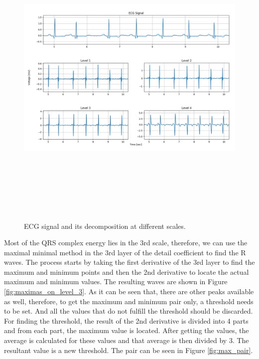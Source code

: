 \begin{figure}[htpb]
	\centering
	\includegraphics[width=15cm,height=15cm,keepaspectratio=true]{images/detail_coefficients}
	\caption{
		ECG signal and its decomposition at different scales.
	}
	\label{fig:detail_coefficients}
\end{figure}

Most of the QRS complex energy lies in the 3rd scale, therefore, we can use the maximal minimal method in the 3rd layer of the detail coefficient to find the R waves.  The process starts by taking the first derivative of the 3rd layer to find the maximum and minimum points and then the 2nd derivative to locate the actual maximum and minimum values. The resulting waves are shown in Figure \ref{fig:maximas_on_level_3}. As it can be seen that, there are other peaks available as well, therefore, to get the maximum and minimum pair only, a threshold needs to be set. And all the values that do not fulfill the threshold should be discarded. 
For finding the threshold, the result of the 2nd derivative is divided into 4 parts and from each part, the maximum value is located. After getting the values, the average is calculated for these values and that average is then divided by 3. The resultant value is a new threshold. The pair can be seen in Figure \ref{fig:max_pair}.

